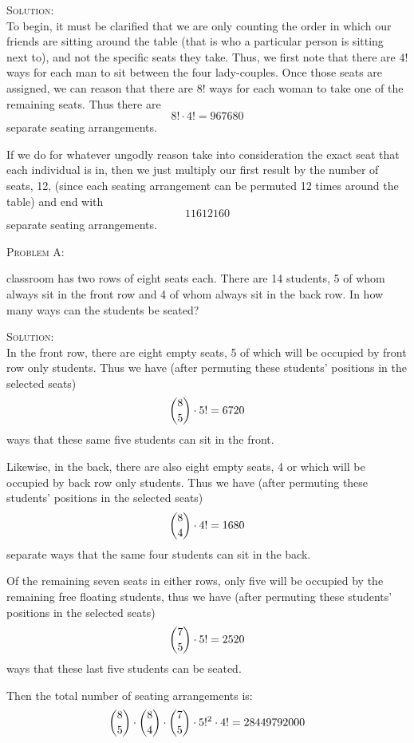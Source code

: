 \documentclass[12pt,oneside]{article}
\newenvironment{problem}[1]
{\begin{mdframed}
        \textsc{Problem #1:}

		}
		    {\end{mdframed}}
\newenvironment{solution}
			    {\textsc{Solution:}\\}
				    {\newpage}
\begin{document}
						\begin{solution}
						To begin, it must be clarified that we are only counting the order in which our friends are sitting around the table (that is who a particular person is sitting next to), and not the specific seats they take.  Thus, we first note that there are $4!$ ways for each man to sit between the four lady-couples. Once those seats are assigned, we can reason that there are $8!$ ways for each woman to take one of the remaining seats.  Thus there are
						\[8!\cdot4!=967680\]
						separate seating arrangements.

						If we do for whatever ungodly reason take into consideration the exact seat that each individual is in, then we just multiply our first result by the number of seats, 12, (since each seating arrangement can be permuted 12 times around the table) and end with
						\[11612160\]
						separate seating arrangements.








						\end{solution}

						\begin{problem}{14}
						A classroom has two rows of eight seats each. There are 14 students, 5 of whom always sit in the front row and 4 of whom always sit in the back row. In how many ways can the students be seated?
						\end{problem}

						\begin{solution}
						In the front row, there are eight empty seats, 5 of which will be occupied by front row only students.  Thus we have (after permuting these students' positions in the selected seats)
						\[\dbinom{8}{5}\cdot5!=6720\]
						ways that these same five students can sit in the front.

						Likewise, in the back, there are also eight empty seats, 4 or which will be occupied by back row only students.  Thus we have (after permuting these students' positions in the selected seats)
						\[\dbinom{8}{4}\cdot4!=1680\]
						separate ways that the same four students can sit in the back.

						Of the remaining seven seats in either rows, only five will be occupied by the remaining free floating students, thus we have
						(after permuting these students' positions in the selected seats)
						\[\dbinom{7}{5}\cdot5!=2520\]
						ways that these last five students can be seated.

						Then the total number of seating arrangements is:
						\[\dbinom{8}{5}\cdot\dbinom{8}{4}\cdot\dbinom{7}{5}\cdot5!^2\cdot4!=28449792000\]


						\end{solution}

						
\end{document}
